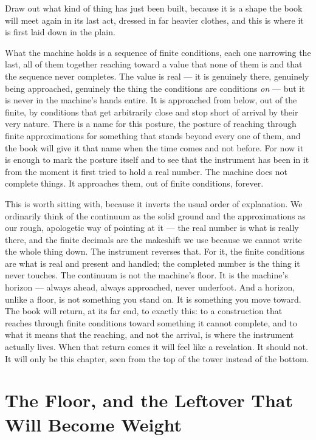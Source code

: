 Draw out what kind of thing has just been built, because it is a shape the book will meet again in its last act,
dressed in far heavier clothes, and this is where it is first laid down in the plain.

What the machine holds is a sequence of finite conditions, each one narrowing the last, all of them together
reaching toward a value that none of them is and that the sequence never completes. The value is real --- it is
genuinely there, genuinely being approached, genuinely the thing the conditions are conditions \emph{on} --- but
it is never in the machine's hands entire. It is approached from below, out of the finite, by conditions that get
arbitrarily close and stop short of arrival by their very nature. There is a name for this posture, the posture
of reaching through finite approximations for something that stands beyond every one of them, and the book will
give it that name when the time comes and not before. For now it is enough to mark the posture itself and to see
that the instrument has been in it from the moment it first tried to hold a real number. The machine does not
complete things. It approaches them, out of finite conditions, forever.

This is worth sitting with, because it inverts the usual order of explanation. We ordinarily think of the
continuum as the solid ground and the approximations as our rough, apologetic way of pointing at it --- the real
number is what is really there, and the finite decimals are the makeshift we use because we cannot write the
whole thing down. The instrument reverses that. For it, the finite conditions are what is real and present and
handled; the completed number is the thing it never touches. The continuum is not the machine's floor. It is the
machine's horizon --- always ahead, always approached, never underfoot. And a horizon, unlike a floor, is not
something you stand on. It is something you move toward. The book will return, at its far end, to exactly this:
to a construction that reaches through finite conditions toward something it cannot complete, and to what it
means that the reaching, and not the arrival, is where the instrument actually lives. When that return comes it
will feel like a revelation. It should not. It will only be this chapter, seen from the top of the tower instead
of the bottom.

\section{The Floor, and the Leftover That Will Become Weight}


